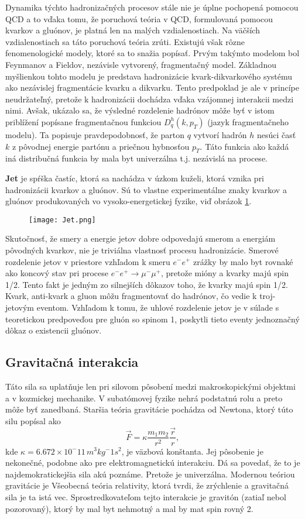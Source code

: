 \documentclass[../../main.tex]{subfiles}
\begin{document}
Dynamika týchto hadronizačných procesov stále nie je úplne pochopená pomocou QCD a to vďaka tomu, že poruchová teória v QCD, formulovaná pomocou kvarkov a gluónov, je platná len na malých vzdialenostiach. Na väčších vzdialenostiach sa táto poruchová teória zrúti. Existujú však rôzne fenomenologické modely, ktoré sa to snažia popísať. Prvým takýmto modelom bol Feynmanov a Fieldov, nezávisle vytvorený, fragmentačný model. Základnou myšlienkou tohto modelu je predstava hadronizácie kvark-dikvarkového systému ako nezávislej fragmentácie kvarku a dikvarku. Tento predpoklad je ale v princípe neudržateľný, pretože k hadronizácii dochádza vďaka vzájomnej interakcii medzi nimi. Avšak, ukázalo sa, že výsledné rozdelenie hadrónov môže byť v istom priblížení popísane fragmentačnou funkciou $D^h_q(k,p_T)$ (jazyk fragmentačneho modelu). Ta popisuje pravdepodobnosť, že parton $q$ vytvorí hadrón $h$ nesúci časť $k$ z pôvodnej energie partónu a priečnou hybnosťou $p_T$. Táto funkcia ako každá iná distribučná funkcia by mala byt univerzálna t.j. nezávislá na procese.

\textbf{Jet} je spŕška častíc, ktorá sa nachádza v úzkom kuželi, ktorá vznika pri hadronizácii kvarkov a gluónov. Sú to vlastne experimentálne znaky kvarkov a gluónov produkovaných vo vysoko-energetickej fyzike, viď obrázok \ref{sf1:fig:jet}. 
\begin{figure}[!h]
\centering
\texttt{[image: Jet.png]}
\caption{}
\label{sf1:fig:jet}
\end{figure}
Skutočnosť, že smery a energie jetov dobre odpovedajú smerom a energiám pôvodných kvarkov, nie je triviálna vlastnosť procesu hadronizácie. Smerové rozdelenie jetov v priestore vzhľadom k smeru $e^-e^+$ zrážky by malo byt rovnaké ako koncový stav pri procese $e^-e^+\rightarrow \mu^-\mu^+$, pretože mióny a kvarky majú spin 1/2. Tento fakt je jedným zo silnejších dôkazov toho, že kvarky majú spin 1/2. Kvark, anti-kvark a gluon môžu fragmentovať do hadrónov, čo vedie k troj-jetovým eventom. Vzhľadom k tomu, že uhlové rozdelenie jetov je v súlade s teoretickou predpoveďou pre gluón so spinom 1, poskytli tieto eventy jednoznačný dôkaz o existencii gluónov.

\subsection{Gravitačná interakcia}
Táto sila sa uplatňuje len pri silovom pôsobení medzi makroskopickými objektmi a v kozmickej mechanike. V subatómovej fyzike nehrá podstatnú rolu a preto môže byť zanedbaná. Staršia teória gravitácie pochádza od Newtona, ktorý túto silu popísal ako $$ \vec{F}=\kappa\frac{m_1m_2}{r^2}\frac{\vec{r}}{r}, $$ kde $\kappa=6.672\times10^-11\,m^3kg^-1s^2$, je väzbová konštanta. Jej pôsobenie je nekonečné, podobne ako pre elektromagnetickú interakciu. Dá sa povedať, že to je najdemokratickejšia sila akú poznáme. Pretože je univerzálna. Modernou teóriou gravitácie je Všeobecná teória relativity, ktorá tvrdi, že zrýchlenie a gravitačná sila je ta istá vec. Sprostredkovateľom tejto interakcie je gravitón (zatiaľ nebol pozorovaný), ktorý by mal byt nehmotný a mal by mat spin rovný 2.
\end{document}
